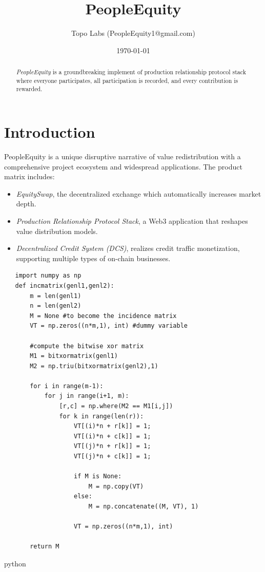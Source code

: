 \documentclass{article}
\title{PeopleEquity}
\author{Topo Labs (PeopleEquity1@gmail.com)}
\date{\today}
\begin{document}
\maketitle

\begin{abstract}

\emph{PeopleEquity} is a groundbreaking implement of production relationship protocol stack where everyone participates, all participation is recorded, and every contribution is rewarded.

\end{abstract}

\section{Introduction}
PeopleEquity is a unique disruptive narrative of value redistribution with a comprehensive project ecosystem and widespread applications. The product matrix includes: 

\begin{itemize}
   \item \emph{EquitySwap}, the decentralized exchange which automatically increases market depth.
   \item \emph{Production Relationship Protocol Stack}, a Web3 application that reshapes value distribution models.
   \item \emph{Decentralized Credit System (DCS)}, realizes credit traffic monetization, supporting multiple types of on-chain businesses. 
\end{itemize}

\begin{verbatim}
   import numpy as np
   def incmatrix(genl1,genl2):
       m = len(genl1)
       n = len(genl2)
       M = None #to become the incidence matrix
       VT = np.zeros((n*m,1), int) #dummy variable
       
       #compute the bitwise xor matrix
       M1 = bitxormatrix(genl1)
       M2 = np.triu(bitxormatrix(genl2),1) 

       for i in range(m-1):
           for j in range(i+1, m):
               [r,c] = np.where(M2 == M1[i,j])
               for k in range(len(r)):
                   VT[(i)*n + r[k]] = 1;
                   VT[(i)*n + c[k]] = 1;
                   VT[(j)*n + r[k]] = 1;
                   VT[(j)*n + c[k]] = 1;
                   
                   if M is None:
                       M = np.copy(VT)
                   else:
                       M = np.concatenate((M, VT), 1)
                   
                   VT = np.zeros((n*m,1), int)
       
       return M
   \end{verbatim}{python}
\end{document}
